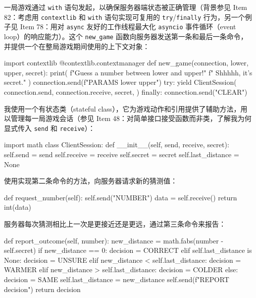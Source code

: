 一局游戏通过 \texttt{with} 语句发起，以确保服务器端状态被正确管理（背景参见 Item 82：考虑用 \texttt{contextlib} 和 \texttt{with} 语句实现可复用的 \texttt{try}/\texttt{finally} 行为，另一个例子见 Item 78：用对 \texttt{async} 友好的工作线程最大化 \texttt{asyncio} 事件循环（event loop）的响应能力）。这个 \texttt{new\_game} 函数向服务器发送第一条和最后一条命令，并提供一个在整局游戏期间使用的上下文对象：

\begin{codebox}[python]
import contextlib
@contextlib.contextmanager
def new_game(connection, lower, upper, secret):
    print(
        f"Guess a number between {lower} and {upper}!"
        f" Shhhhh, it's {secret}."
    )
    connection.send(f"PARAMS {lower} {upper}")
    try:
        yield ClientSession(
            connection.send,
            connection.receive,
            secret,
        )
    finally:
        connection.send("CLEAR")
\end{codebox}

我使用一个有状态类（stateful class），它为游戏动作和引用提供了辅助方法，用以管理每一局游戏会话（参见 Item 48：对简单接口接受函数而非类，了解我为何显式传入 \texttt{send} 和 \texttt{receive}）：

\begin{codebox}[python]
import math
class ClientSession:
    def __init__(self, send, receive, secret):
        self.send = send
        self.receive = receive
        self.secret = secret
        self.last_distance = None
\end{codebox}

使用实现第二条命令的方法，向服务器请求新的猜测值：

\begin{codebox}[python]
    def request_number(self):
        self.send("NUMBER")
        data = self.receive()
        return int(data)
\end{codebox}

服务器每次猜测相比上一次是更接近还是更远，通过第三条命令来报告：

\begin{codebox}[python]
    def report_outcome(self, number):
        new_distance = math.fabs(number - self.secret)
        if new_distance == 0:
            decision = CORRECT
        elif self.last_distance is None:
            decision = UNSURE
        elif new_distance < self.last_distance:
            decision = WARMER
        elif new_distance > self.last_distance:
            decision = COLDER
        else:
            decision = SAME
        self.last_distance = new_distance
        self.send(f"REPORT {decision}")
        return decision
\end{codebox}


